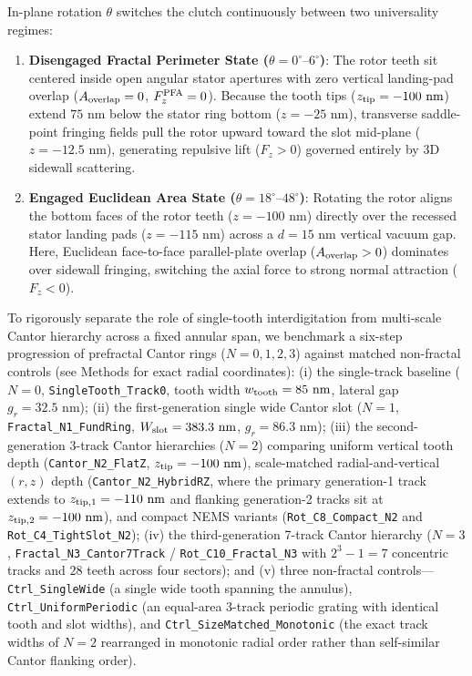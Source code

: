 \documentclass[11pt,letterpaper]{article}
\begin{document}
In-plane rotation $\theta$ switches the clutch continuously between two universality regimes:
\begin{enumerate}
    \item \textbf{Disengaged Fractal Perimeter State ($\theta = 0^\circ\text{--}6^\circ$)}: The rotor teeth sit centered inside open angular stator apertures with zero vertical landing-pad overlap ($A_{\rm overlap} = 0$, $F_z^{\rm PFA} = 0$). Because the tooth tips ($z_{\rm tip} = -100\text{ nm}$) extend $75\text{ nm}$ below the stator ring bottom ($z = -25\text{ nm}$), transverse saddle-point fringing fields pull the rotor upward toward the slot mid-plane ($z = -12.5\text{ nm}$), generating repulsive lift ($F_z > 0$) governed entirely by 3D sidewall scattering.
    \item \textbf{Engaged Euclidean Area State ($\theta = 18^\circ\text{--}48^\circ$)}: Rotating the rotor aligns the bottom faces of the rotor teeth ($z = -100\text{ nm}$) directly over the recessed stator landing pads ($z = -115\text{ nm}$) across a $d = 15\text{ nm}$ vertical vacuum gap. Here, Euclidean face-to-face parallel-plate overlap ($A_{\rm overlap} > 0$) dominates over sidewall fringing, switching the axial force to strong normal attraction ($F_z < 0$).
\end{enumerate}

To rigorously separate the role of single-tooth interdigitation from multi-scale Cantor hierarchy across a fixed annular span, we benchmark a six-step progression of prefractal Cantor rings ($N=0, 1, 2, 3$) against matched non-fractal controls (see Methods for exact radial coordinates): (i) the single-track baseline ($N=0$, \texttt{SingleTooth\_Track0}, tooth width $w_{\rm tooth} = 85\text{ nm}$, lateral gap $g_r = 32.5\text{ nm}$); (ii) the first-generation single wide Cantor slot ($N=1$, \texttt{Fractal\_N1\_FundRing}, $W_{\rm slot} = 383.3\text{ nm}$, $g_r = 86.3\text{ nm}$); (iii) the second-generation 3-track Cantor hierarchies ($N=2$) comparing uniform vertical tooth depth (\texttt{Cantor\_N2\_FlatZ}, $z_{\rm tip} = -100\text{ nm}$), scale-matched radial-and-vertical $(r,z)$ depth (\texttt{Cantor\_N2\_HybridRZ}, where the primary generation-1 track extends to $z_{\rm tip,1} = -110\text{ nm}$ and flanking generation-2 tracks sit at $z_{\rm tip,2} = -100\text{ nm}$), and compact NEMS variants (\texttt{Rot\_C8\_Compact\_N2} and \texttt{Rot\_C4\_TightSlot\_N2}); (iv) the third-generation 7-track Cantor hierarchy ($N=3$, \texttt{Fractal\_N3\_Cantor7Track} / \texttt{Rot\_C10\_Fractal\_N3} with $2^3 - 1 = 7$ concentric tracks and $28$ teeth across four sectors); and (v) three non-fractal controls---\texttt{Ctrl\_SingleWide} (a single wide tooth spanning the annulus), \texttt{Ctrl\_UniformPeriodic} (an equal-area 3-track periodic grating with identical tooth and slot widths), and \texttt{Ctrl\_SizeMatched\_Monotonic} (the exact track widths of $N=2$ rearranged in monotonic radial order rather than self-similar Cantor flanking order).
\end{document}
